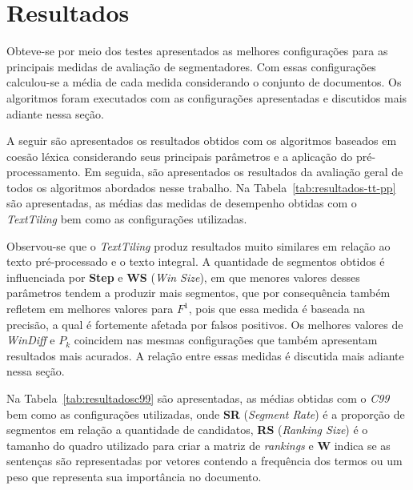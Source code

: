 \section{Resultados}

Obteve-se por meio dos testes apresentados as melhores configurações para as principais medidas de avaliação de segmentadores. Com essas configurações calculou-se a média de cada medida considerando o conjunto de documentos. Os algoritmos foram executados com as configurações apresentadas e discutidos mais adiante nessa seção.

A seguir são apresentados os resultados obtidos com os algoritmos baseados em coesão léxica 
considerando seus principais parâmetros e a aplicação do pré-processamento. Em seguida, são apresentados os resultados da avaliação geral de todos os algoritmos abordados nesse trabalho.
Na Tabela~\ref{tab:resultados-tt-pp} são apresentadas, as médias das medidas de desempenho obtidas com o \textit{TextTiling} bem como as configurações utilizadas.


	  



Observou-se que o \textit{TextTiling} produz resultados muito similares em relação ao texto pré-processado e o texto integral. A quantidade de segmentos obtidos é influenciada por \textbf{Step} e \textbf{WS} (\textit{Win Size}), em que menores valores desses parâmetros tendem a produzir mais segmentos, que por consequência também refletem em melhores valores para $F^1$, pois que essa medida é baseada na precisão, a qual é fortemente afetada por falsos positivos. Os melhores valores de \textit{WinDiff} e $P_k$ coincidem nas mesmas configurações que também apresentam resultados mais acurados. A relação entre essas medidas é discutida mais adiante nessa seção.



  


Na Tabela~\ref{tab:resultadosc99} são apresentadas, as médias obtidas com o \textit{C99} bem como as configurações utilizadas, onde \textbf{SR} (\textit{Segment Rate}) é a proporção de segmentos em relação a quantidade de candidatos, \textbf{RS} (\textit{Ranking Size}) é o tamanho do quadro utilizado para criar a matriz de \textit{rankings} e \textbf{W} indica se as sentenças são representadas por vetores contendo a frequência dos termos ou um peso que representa sua importância no documento. %



